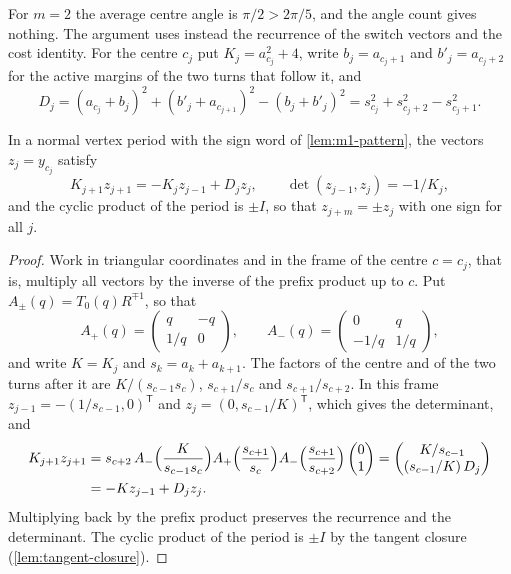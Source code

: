 For $m=2$ the average centre angle is $\pi/2>2\pi/5$, and the angle count gives nothing. The
argument uses instead the recurrence of the switch vectors and the cost identity. For the centre
$c_j$ put $K_j=a_{c_j}^2+4$, write $b_j=a_{c_j+1}$ and $b'_j=a_{c_j+2}$ for the active margins of
the two turns that follow it, and
\[
  D_j=(a_{c_j}+b_j)^2+(b'_j+a_{c_{j+1}})^2-(b_j+b'_j)^2=s_{c_j}^2+s_{c_j+2}^2-s_{c_j+1}^2 .
\]

\begin{lemma}\label{lem:m1-recurrence}
  In a normal vertex period with the sign word of \cref{lem:m1-pattern}, the vectors $z_j=y_{c_j}$
  satisfy
  \[
    K_{j+1}z_{j+1}=-K_jz_{j-1}+D_jz_j,\qquad \det(z_{j-1},z_j)=-1/K_j,
  \]
  and the cyclic product of the period is $\pm I$, so that $z_{j+m}=\pm z_j$ with one sign for all
  $j$.
\end{lemma}

\begin{proof}
  Work in triangular coordinates and in the frame of the centre $c=c_j$, that is, multiply all
  vectors by the inverse of the prefix product up to $c$. Put $A_\pm(q)=T_0(q)R^{\mp1}$, so that
  \[
    A_+(q)=\begin{pmatrix}q&-q\\ 1/q&0\end{pmatrix},\qquad
    A_-(q)=\begin{pmatrix}0&q\\ -1/q&1/q\end{pmatrix},
  \]
  and write $K=K_j$ and $s_k=a_k+a_{k+1}$. The factors of the centre and of the two turns after it
  are $K/(s_{c-1}s_c)$, $s_{c+1}/s_c$ and $s_{c+1}/s_{c+2}$. In this frame
  $z_{j-1}=-(1/s_{c-1},0)^{\mathsf T}$ and $z_j=(0,s_{c-1}/K)^{\mathsf T}$, which gives the
  determinant, and
  \begin{align*}
    K_{j+1}z_{j+1}
    &=s_{c+2}\,A_-\Bigl(\frac K{s_{c-1}s_c}\Bigr)A_+\Bigl(\frac{s_{c+1}}{s_c}\Bigr)
      A_-\Bigl(\frac{s_{c+1}}{s_{c+2}}\Bigr)\begin{pmatrix}0\\1\end{pmatrix}
    =\begin{pmatrix}K/s_{c-1}\\ (s_{c-1}/K)\,D_j\end{pmatrix}\\
    &=-Kz_{j-1}+D_jz_j .
  \end{align*}
  Multiplying back by the prefix product preserves the recurrence and the determinant. The
  cyclic product of the period is $\pm I$ by the tangent closure (\cref{lem:tangent-closure}).
\end{proof}

